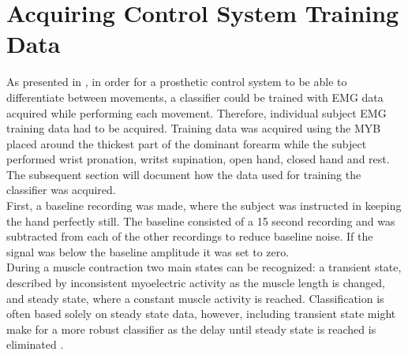 
\section{Acquiring Control System Training Data}

As presented in , in order for a prosthetic control system to be able to differentiate between movements, a classifier could be trained with EMG data acquired while performing each movement. Therefore, individual subject EMG training data had to be acquired. Training data was acquired using the MYB placed around the thickest part of the dominant forearm while the subject performed wrist pronation, writst supination, open hand, closed hand and rest. The subsequent section will document how the data used for training the classifier was acquired. \\
First, a baseline recording was made, where the subject was instructed in keeping the hand perfectly still. The baseline consisted of a 15 second recording and was subtracted from each of the other recordings to reduce baseline noise. If the signal was below the baseline amplitude it was set to zero. \\
During a muscle contraction two main states can be recognized: a transient state, described by inconsistent myoelectric activity as the muscle length is changed, and steady state, where a constant muscle activity is reached. \cite{Mobarak2014} Classification is often based solely on steady state data, however, including transient state might make for a more robust classifier as the delay until steady state is reached is eliminated \cite{Boschmann2013,Mobarak2014a}. \\
%

